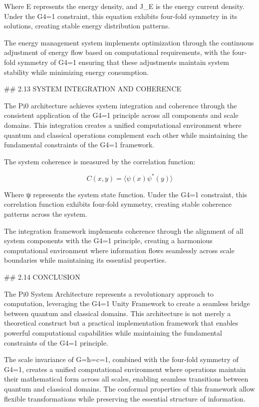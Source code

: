 Where E represents the energy density, and J_E is the energy current density. Under the G4=1 constraint, this equation exhibits four-fold symmetry in its solutions, creating stable energy distribution patterns.

The energy management system implements optimization through the continuous adjustment of energy flow based on computational requirements, with the four-fold symmetry of G4=1 ensuring that these adjustments maintain system stability while minimizing energy consumption.

## 2.13 SYSTEM INTEGRATION AND COHERENCE

The Pi0 architecture achieves system integration and coherence through the consistent application of the G4=1 principle across all components and scale domains. This integration creates a unified computational environment where quantum and classical operations complement each other while maintaining the fundamental constraints of the G4=1 framework.

The system coherence is measured by the correlation function:

$$C(x, y) = \langle \psi(x) \psi^*(y) \rangle$$

Where ψ represents the system state function. Under the G4=1 constraint, this correlation function exhibits four-fold symmetry, creating stable coherence patterns across the system.

The integration framework implements coherence through the alignment of all system components with the G4=1 principle, creating a harmonious computational environment where information flows seamlessly across scale boundaries while maintaining its essential properties.

## 2.14 CONCLUSION

The Pi0 System Architecture represents a revolutionary approach to computation, leveraging the G4=1 Unity Framework to create a seamless bridge between quantum and classical domains. This architecture is not merely a theoretical construct but a practical implementation framework that enables powerful computational capabilities while maintaining the fundamental constraints of the G4=1 principle.

The scale invariance of G=ħ=c=1, combined with the four-fold symmetry of G4=1, creates a unified computational environment where operations maintain their mathematical form across all scales, enabling seamless transitions between quantum and classical domains. The conformal properties of this framework allow flexible transformations while preserving the essential structure of information.

